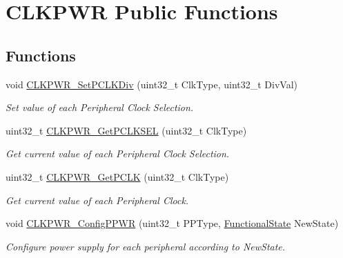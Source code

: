 \hypertarget{group___c_l_k_p_w_r___public___functions}{\section{\-C\-L\-K\-P\-W\-R \-Public \-Functions}
\label{group___c_l_k_p_w_r___public___functions}
}
\subsection*{\-Functions}
\begin{DoxyCompactItemize}
\item 
void \hyperlink{group___c_l_k_p_w_r___public___functions_ga4e68fb4cf5c06c32b6ee6aea8dbaf78c}{\-C\-L\-K\-P\-W\-R\-\_\-\-Set\-P\-C\-L\-K\-Div} (uint32\-\_\-t \-Clk\-Type, uint32\-\_\-t \-Div\-Val)
\begin{DoxyCompactList}\small\item\em \-Set value of each \-Peripheral \-Clock \-Selection. \end{DoxyCompactList}\item 
uint32\-\_\-t \hyperlink{group___c_l_k_p_w_r___public___functions_ga2afcbf9f69a8c416a154969a1e7b2935}{\-C\-L\-K\-P\-W\-R\-\_\-\-Get\-P\-C\-L\-K\-S\-E\-L} (uint32\-\_\-t \-Clk\-Type)
\begin{DoxyCompactList}\small\item\em \-Get current value of each \-Peripheral \-Clock \-Selection. \end{DoxyCompactList}\item 
uint32\-\_\-t \hyperlink{group___c_l_k_p_w_r___public___functions_ga1eea2e1c8aac99147b88d5c18928ffa8}{\-C\-L\-K\-P\-W\-R\-\_\-\-Get\-P\-C\-L\-K} (uint32\-\_\-t \-Clk\-Type)
\begin{DoxyCompactList}\small\item\em \-Get current value of each \-Peripheral \-Clock. \end{DoxyCompactList}\item 
void \hyperlink{group___c_l_k_p_w_r___public___functions_gac29f7879a37c604a1040499001ba0121}{\-C\-L\-K\-P\-W\-R\-\_\-\-Config\-P\-P\-W\-R} (uint32\-\_\-t \-P\-P\-Type, \hyperlink{group___l_p_c___types___public___types_gac9a7e9a35d2513ec15c3b537aaa4fba1}{\-Functional\-State} \-New\-State)
\begin{DoxyCompactList}\small\item\em \-Configure power supply for each peripheral according to \-New\-State. \end{DoxyCompactList}\item 

\end{DoxyCompactItemize}
